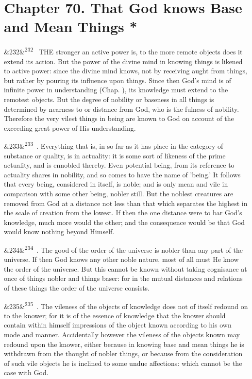\documentclass[12pt]{article}
\newcommand{\para}[1][]{\par\noindent\ifx&#1&\else\textsuperscript{\footnotesize #1}~\fi}
\begin{document}
\section*{Chapter 70. That God knows Base and Mean Things *}

\para[232] THE stronger an active power is, to the more remote objects does it extend its action. But the power of the divine mind in knowing things is likened to active power: since the divine mind knows, not by receiving aught from things, but rather by pouring its influence upon things. Since then God's mind is of infinite power in understanding (Chap. ), its knowledge must extend to the remotest objects. But the degree of nobility or baseness in all things is determined by nearness to or distance from God, who is the fulness of nobility. Therefore the very vilest things in being are known to God on account of the exceeding great power of His understanding.

\para[233] 2. Everything that is, in so far as it has place in the category of substance or quality, is in actuality: it is some sort of likeness of the prime actuality, and is ennobled thereby. Even potential being, from its reference to actuality shares in nobility, and so comes to have the name of 'being.' It follows that every being, considered in itself, is noble; and is only mean and vile in comparison with some other being, nobler still. But the noblest creatures are removed from God at a distance not less than that which separates the highest in the scale of creation from the lowest. If then the one distance were to bar God's knowledge, much more would the other; and the consequence would be that God would know nothing beyond Himself.

\para[234] 3. The good of the order of the universe is nobler than any part of the universe. If then God knows any other noble nature, most of all must He know the order of the universe. But this cannot be known without taking cognisance at once of things nobler and things baser: for in the mutual distances and relations of these things the order of the universe consists.

\para[235] 4. The vileness of the objects of knowledge does not of itself redound on to the knower; for it is of the essence of knowledge that the knower should contain within himself impressions of the object known according to his own mode and manner. Accidentally however the vileness of the objects known may redound upon the knower, either because in knowing base and mean things he is withdrawn from the thought of nobler things, or because from the consideration of such vile objects he is inclined to some undue affections: which cannot be the case with God.
\end{document}
